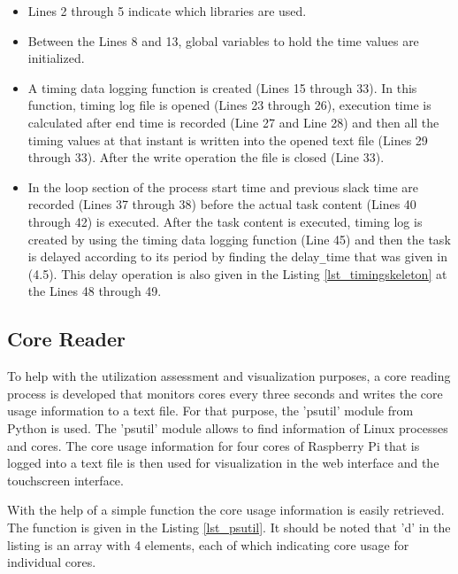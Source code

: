 \begin{itemize}
	\item Lines 2 through 5 indicate which libraries are used.
	\item Between the Lines 8 and 13, global variables to hold the time values are initialized.
	\item A timing data logging function is created (Lines 15 through 33). In this function, timing log file is opened (Lines 23 through 26), execution time is calculated after end time is recorded (Line 27 and Line 28) and then all the timing values at that instant is written into the opened text file (Lines 29 through 33). After the write operation the file is closed (Line 33).
	\item In the loop section of the process start time and previous slack time are recorded (Lines 37 through 38) before the actual task content (Lines 40 through 42) is executed. After the task content is executed, timing log is created by using the timing data logging function (Line 45) and then the task is delayed according to its period by finding the delay\texttt{\_}time that was given in (4.5). This delay operation is also given in the Listing \ref{lst_timingskeleton} at the Lines 48 through 49.  
\end{itemize}

\subsection{Core Reader}
To help with the utilization assessment and visualization purposes, a core reading process is developed that monitors cores every three seconds and writes the core usage information to a text file. For that purpose, the 'psutil' module \cite{psutil} from Python is used. The 'psutil' module allows to find information of Linux processes and cores. The core usage information for four cores of Raspberry Pi that is logged into a text file is then used for visualization in the web interface and the touchscreen interface. 

With the help of a simple function the core usage information is easily retrieved. The function is given in the Listing \ref{lst_psutil}. It should be noted that 'd' in the listing is an array with 4 elements, each of which indicating core usage for individual cores.

\newpage


